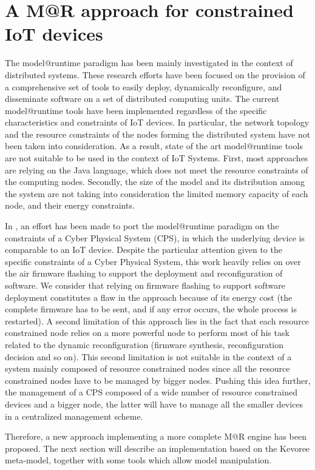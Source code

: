 \section{A M@R approach for constrained IoT devices}
The model@runtime paradigm has been mainly investigated in the context of distributed systems. 
These research efforts have been focused on the provision of a comprehensive set of tools to easily deploy, dynamically reconfigure, and disseminate software on a set of distributed computing units.
The current model@runtime tools have been implemented regardless of the specific characteristics and constraints of IoT devices.
In particular, the network topology and the resource constraints of the nodes forming the distributed system have not been taken into consideration.
As a result, state of the art model@runtime tools are not suitable to be used in the context of IoT Systems.
First, most approaches are relying on the Java language, which does not meet the resource constraints of the computing nodes. 
Secondly, the size of the model and its distribution among the system are not taking into consideration the limited memory capacity of each node, and their energy constraints.

In \cite{fouquet2012dynamic}, an effort has been made to port the model@runtime paradigm on the constraints of a Cyber Physical System (CPS), in which the underlying device is comparable to an IoT device.
Despite the particular attention given to the specific constraints of a Cyber Physical System, this work heavily relies on over the air firmware flashing to support the deployment and reconfiguration of software. 
We consider that relying on firmware flashing to support software deployment constitutes a flaw in the approach because of its energy cost (the complete firmware has to be sent, and if any error occurs, the whole process is restarted).
A second limitation of this approach lies in the fact that each resource constrained node relies on a more powerful node to perform most of his task related to the dynamic reconfiguration (firmware synthesis, reconfiguration decision and so on).
This second limitation is not suitable in the context of a system mainly composed of resource constrained nodes since all the resource constrained nodes have to be managed by bigger nodes.
Pushing this idea further, the management of a CPS composed of a wide number of resource constrained devices and a bigger node, the latter will have to manage all the smaller devices in a centralized management scheme.

Therefore, a new approach implementing a more complete M@R engine has been proposed.
The next section will describe an implementation based on the Kevoree meta-model, together with some tools which allow model manipulation.

